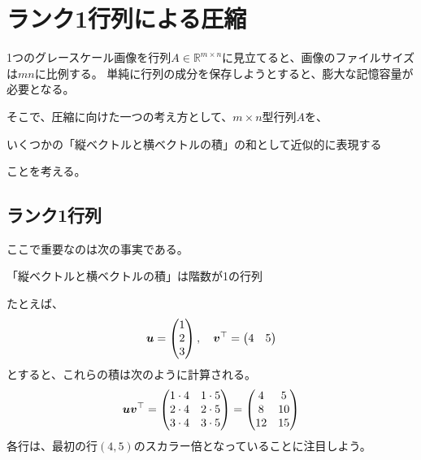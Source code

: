 \documentclass[../../../topic_linear-algebra]{subfiles}
\begin{document}
\sectionline
\section{ランク1行列による圧縮}

1つのグレースケール画像を行列$A \in \mathbb{R}^{m \times n}$に見立てると、画像のファイルサイズは$mn$に比例する。
単純に行列の成分を保存しようとすると、膨大な記憶容量が必要となる。

\br

そこで、圧縮に向けた一つの考え方として、$m \times n$型行列$A$を、
\begin{emphabox}
  \begin{spacebox}
    \begin{center}
      いくつかの「縦ベクトルと横ベクトルの積」の和として近似的に表現する
    \end{center}
  \end{spacebox}
\end{emphabox}
ことを考える。

\subsection{ランク1行列}

ここで重要なのは次の事実である。
\begin{emphabox}
  \begin{spacebox}
    \begin{center}
      「縦ベクトルと横ベクトルの積」は階数が1の行列
    \end{center}
  \end{spacebox}
\end{emphabox}

たとえば、
\begin{equation*}
  \vb*{u} = \begin{pmatrix}
    1 \\
    2 \\
    3
  \end{pmatrix}, \quad
  \vb*{v}^\top = \begin{pmatrix}
    4 & 5
  \end{pmatrix}
\end{equation*}
とすると、これらの積は次のように計算される。
\begin{equation*}
  \vb*{u} \vb*{v}^\top = \begin{pmatrix}
    1 \cdot 4 & 1 \cdot 5 \\
    2 \cdot 4 & 2 \cdot 5 \\
    3 \cdot 4 & 3 \cdot 5
  \end{pmatrix} = \begin{pmatrix}
    4 & 5 \\
    8 & 10 \\
    12 & 15
  \end{pmatrix}
\end{equation*}
各行は、最初の行$(4,5)$のスカラー倍となっていることに注目しよう。
\end{document}
